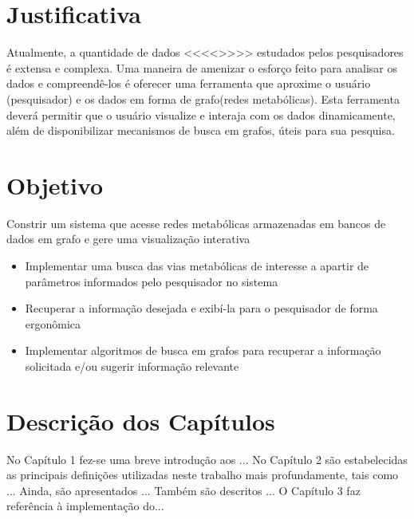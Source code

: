 \section{Justificativa}

\indent 

Atualmente, a quantidade de dados <<<<>>>> estudados pelos pesquisadores é extensa e complexa. Uma maneira de amenizar o esforço feito para analisar os dados e compreendê-los é oferecer uma ferramenta que aproxime o usuário (pesquisador) e os dados em forma de grafo(redes metabólicas). Esta ferramenta deverá permitir que o usuário visualize e interaja com os dados dinamicamente, além de disponibilizar mecanismos de busca em grafos, úteis para sua pesquisa.


\section{Objetivo}

\indent 
Constrir um sistema que acesse redes metabólicas armazenadas em bancos de dados em grafo e gere uma visualização interativa
\begin{itemize}
 \item Implementar uma busca das vias metabólicas de interesse a apartir de parâmetros informados pelo pesquisador no sistema
 \item Recuperar a informação desejada e exibí-la para o pesquisador de forma ergonômica
 \item Implementar algoritmos de busca em grafos para recuperar a informação solicitada e/ou sugerir informação relevante
\end{itemize}

\section{Descrição dos Capítulos}

\indent No Capítulo 1 fez-se uma breve introdução aos ... No Capítulo 2 são estabelecidas as principais definições utilizadas neste trabalho mais profundamente, tais 
como ... Ainda, são apresentados ... Também são descritos ... O Capítulo 3 faz referência à implementação do... 






